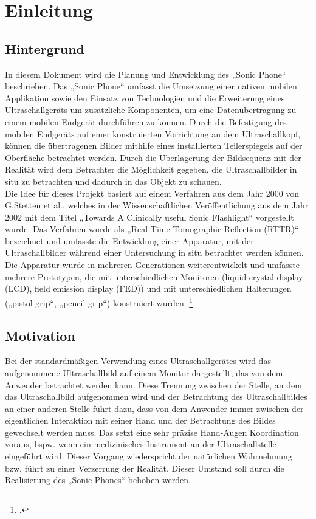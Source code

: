 \chapter{Einleitung}\label{chap:Einleitung}
\section{Hintergrund}
In diesem Dokument wird die Planung und Entwicklung des „Sonic Phone“ beschrieben. Das „Sonic Phone“ umfasst die Umsetzung einer nativen mobilen Applikation sowie den Einsatz von Technologien und die Erweiterung eines Ultraschallgeräts um zusätzliche Komponenten, um eine Datenübertragung zu einem mobilen Endgerät durchführen zu können. Durch die Befestigung des mobilen Endgeräts auf einer konstruierten Vorrichtung an dem Ultraschallkopf, können die übertragenen Bilder mithilfe eines installierten Teilerspiegels auf der Oberfläche betrachtet werden.  Durch die Überlagerung der Bildsequenz mit der Realität wird dem Betrachter die Möglichkeit gegeben, die Ultraschallbilder in situ zu betrachten und dadurch in das Objekt zu schauen.\\
Die Idee für dieses Projekt basiert auf einem Verfahren aus dem Jahr 2000 von G.Stetten et al., welches in der Wissenschaftlichen Veröffentlichung aus dem Jahr 2002 mit dem Titel „Towards A Clinically useful Sonic Flashlight“ vorgestellt wurde. Das Verfahren wurde als „Real Time Tomographic Reflection (RTTR)“ bezeichnet und umfasste die Entwicklung einer Apparatur, mit der Ultraschallbilder während einer Untersuchung in situ  betrachtet werden können. Die Apparatur wurde in mehreren Generationen weiterentwickelt und umfasste mehrere Prototypen, die mit unterschiedlichen Monitoren (liquid crystal display (LCD), field emission display (FED)) und mit unterschiedlichen Halterungen („pistol grip“, „pencil grip“) konstruiert wurden. \footcite{SonicFlashlight} 

\section{Motivation}
Bei der standardmäßigen Verwendung eines Ultraschallgerätes wird das aufgenommene Ultraschallbild auf einem Monitor dargestellt, das von dem Anwender betrachtet werden kann. Diese Trennung zwischen der Stelle, an dem das Ultraschallbild aufgenommen wird und der Betrachtung des Ultraschallbildes an einer anderen Stelle führt dazu, dass von dem Anwender immer zwischen der eigentlichen Interaktion mit seiner Hand und der Betrachtung des Bildes gewechselt werden muss. Das setzt eine sehr präzise Hand-Augen Koordination voraus, bspw. wenn ein medizinisches Instrument an der Ultraschallstelle eingeführt wird. Dieser Vorgang wiederspricht der natürlichen Wahrnehmung bzw. führt zu einer Verzerrung der Realität. Dieser Umstand soll durch die Realisierung des „Sonic Phones“ behoben werden.
